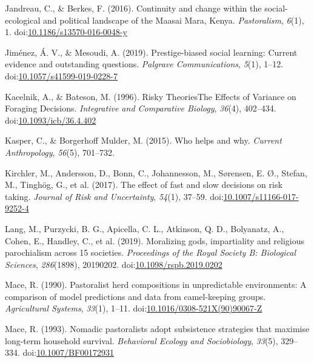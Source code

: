 \documentclass[
  11pt,
]{article}
\begin{document}
\leavevmode\hypertarget{ref-jandreauContinuityChangeSocialecological2016}{}%
Jandreau, C., \& Berkes, F. (2016). Continuity and change within the
social-ecological and political landscape of the Maasai Mara, Kenya.
\emph{Pastoralism}, \emph{6}(1), 1.
doi:\href{https://doi.org/10.1186/s13570-016-0048-y}{10.1186/s13570-016-0048-y}

\leavevmode\hypertarget{ref-jimenezPrestigebiasedSocialLearning2019}{}%
Jiménez, Á. V., \& Mesoudi, A. (2019). Prestige-biased social learning:
Current evidence and outstanding questions. \emph{Palgrave
Communications}, \emph{5}(1), 1--12.
doi:\href{https://doi.org/10.1057/s41599-019-0228-7}{10.1057/s41599-019-0228-7}

\leavevmode\hypertarget{ref-kacelnikRiskyTheoriesEffects1996}{}%
Kacelnik, A., \& Bateson, M. (1996). Risky TheoriesThe Effects of
Variance on Foraging Decisions. \emph{Integrative and Comparative
Biology}, \emph{36}(4), 402--434.
doi:\href{https://doi.org/10.1093/icb/36.4.402}{10.1093/icb/36.4.402}

\leavevmode\hypertarget{ref-kasperWhoHelpsWhy2015}{}%
Kasper, C., \& Borgerhoff Mulder, M. (2015). Who helps and why.
\emph{Current Anthropology}, \emph{56}(5), 701--732.

\leavevmode\hypertarget{ref-kirchlerEffectFastSlow2017}{}%
Kirchler, M., Andersson, D., Bonn, C., Johannesson, M., Sørensen, E. Ø.,
Stefan, M., Tinghög, G., et al. (2017). The effect of fast and slow
decisions on risk taking. \emph{Journal of Risk and Uncertainty},
\emph{54}(1), 37--59.
doi:\href{https://doi.org/10.1007/s11166-017-9252-4}{10.1007/s11166-017-9252-4}

\leavevmode\hypertarget{ref-langMoralizingGodsImpartiality2019b}{}%
Lang, M., Purzycki, B. G., Apicella, C. L., Atkinson, Q. D., Bolyanatz,
A., Cohen, E., Handley, C., et al. (2019). Moralizing gods, impartiality
and religious parochialism across 15 societies. \emph{Proceedings of the
Royal Society B: Biological Sciences}, \emph{286}(1898), 20190202.
doi:\href{https://doi.org/10.1098/rspb.2019.0202}{10.1098/rspb.2019.0202}

\leavevmode\hypertarget{ref-macePastoralistHerdCompositions1990a}{}%
Mace, R. (1990). Pastoralist herd compositions in unpredictable
environments: A comparison of model predictions and data from
camel-keeping groups. \emph{Agricultural Systems}, \emph{33}(1), 1--11.
doi:\href{https://doi.org/10.1016/0308-521X(90)90067-Z}{10.1016/0308-521X(90)90067-Z}

\leavevmode\hypertarget{ref-maceNomadicPastoralistsAdopt1993a}{}%
Mace, R. (1993). Nomadic pastoralists adopt subsistence strategies that
maximise long-term household survival. \emph{Behavioral Ecology and
Sociobiology}, \emph{33}(5), 329--334.
doi:\href{https://doi.org/10.1007/BF00172931}{10.1007/BF00172931}
\end{document}
